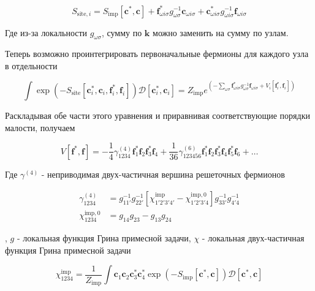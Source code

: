 \documentclass[11pt,a4paper]{report}
\begin{document}
\begin{equation}
 S_{\text{site},i} = S_{\text{imp}}[\mathbf{c}^*,\mathbf{c}] + \mathbf{f}^*_{\omega i\sigma} g_{\omega\sigma}^{-1}\mathbf{c}_{\omega i\sigma} + \mathbf{c}^*_{\omega i\sigma} g_{\omega i\sigma}^{-1}\mathbf{f}_{\omega i\sigma}
\end{equation}

Где из-за локальности $g_{\omega\sigma}$, сумму по $\mathbf{k}$ можно заменить на сумму по узлам.

Теперь возможно проинтегрировать первоначальные фермионы для каждого узла в отдельности

\begin{equation}
 \int \exp{(-S_{\text{site}}[\mathbf{c}^*_i,\mathbf{c}_i,\mathbf{f}^*_i,\mathbf{f}_i])}\mathcal{D}[\mathbf{c}^*_i,\mathbf{c}_i] = Z_{\text{imp}} e^{(-\sum_{\omega\sigma}\mathbf{f}^*_{\omega i\sigma}g_{\omega\sigma}^{-1}\mathbf{f}_{\omega i\sigma}+V_i[\mathbf{f}^*_i,\mathbf{f}_i])}
\end{equation}

Раскладывая обе части этого уравнения и приравнивая соответствующие порядки малости, получаем

\begin{equation}
 V[\mathbf{f}^*,\mathbf{f}] = -\frac{1}{4} \gamma_{1234}^{(4)}\mathbf{f}^*_{1}\mathbf{f}_{2}\mathbf{f}^*_{3}\mathbf{f}_{4} + 
 \frac{1}{36} \gamma_{123456}^{(6)}\mathbf{f}^*_{1}\mathbf{f}_{2}\mathbf{f}^*_{3}\mathbf{f}_{4}\mathbf{f}^*_{5}\mathbf{f}_{6} + \dots
\end{equation}

Где $\gamma^{(4)}$ - неприводимая двух-частичная вершина решеточных фермионов

\begin{equation}
\begin{split}
 \gamma_{1234}^{(4)} &= g_{11'}^{-1}g_{22'}^{-1}\left[\chi_{1'2'3'4'}^{\text{imp}}-\chi_{1'2'3'4}^{\text{imp},0}\right]g_{33'}^{-1}g_{4'4}^{-1} \\
 \chi_{1234}^{\text{imp},0} &= g_{14}g_{23} - g_{13}g_{24}
\end{split}
\end{equation}

, $g$ - локальная функция Грина примесной задачи, $\chi$ - локальная двух-частичная функция Грина примесной задачи

\begin{equation}
 \chi_{1234}^{\text{imp}} = \frac{1}{Z_{\text{imp}}} \int \mathbf{c}_1 \mathbf{c}_2 \mathbf{c}^*_3 \mathbf{c}^*_4 \exp{(-S_{\text{imp}}[\mathbf{c}^*,\mathbf{c}])}\mathcal{D}[\mathbf{c}^*,\mathbf{c}]
\end{equation}
\end{document}
